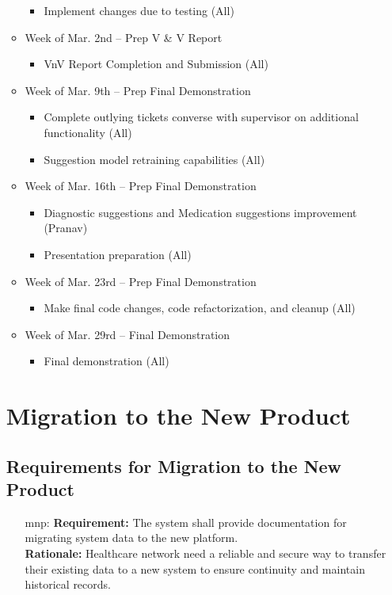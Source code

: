 \documentclass[12pt]{article}
\newcounter{mnpnum} %
\begin{document}
\begin{itemize}
\begin{itemize}
\begin{itemize}
      \item Implement changes due to testing (All)
    \end{itemize}
  \item Week of Mar. 2nd -- Prep V & V Report
    \begin{itemize}
      \item VnV Report Completion and Submission (All)
    \end{itemize}
  \item Week of Mar. 9th -- Prep Final Demonstration
    \begin{itemize}
      \item Complete outlying tickets converse with supervisor on additional functionality (All)
      \item Suggestion model retraining capabilities (All)
    \end{itemize}
  \item Week of Mar. 16th -- Prep Final Demonstration
    \begin{itemize}
      \item Diagnostic suggestions and Medication suggestions improvement (Pranav)
      \item Presentation preparation (All)
    \end{itemize}
  \item Week of Mar. 23rd -- Prep Final Demonstration
    \begin{itemize}
      \item Make final code changes, code refactorization, and cleanup (All)
    \end{itemize}
  \item Week of Mar. 29rd -- Final Demonstration
    \begin{itemize}
      \item Final demonstration (All)
    \end{itemize}

\end{itemize}

\section{Migration to the New Product}
\subsection{Requirements for Migration to the New Product}
\begin{itemize}
  \item [mnp\refstepcounter{mnpnum}\themnpnum \label{MNP_tools}:] 
  \textbf{Requirement:} The system shall provide documentation for migrating system data to the new platform.\\
  \textbf{Rationale:} Healthcare network need a reliable and secure way to transfer their existing data to a new system to ensure continuity and maintain historical records.\\


\end{itemize}
\end{itemize}
\end{document}
